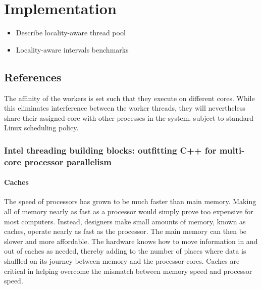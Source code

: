 
\chapter{Implementation}
\label{chap:locality-implementation}


\begin{itemize}
\item Describe locality-aware thread pool
\item Locality-aware intervals benchmarks
\end{itemize}

\section{References}

The affinity of the workers is set such that they execute on different
cores. While this eliminates interference between the worker threads,
they will nevertheless share their assigned core with other processes
in the system, subject to standard Linux scheduling policy.

\subsection*{Intel threading building blocks: outfitting C++ for
  multi-core processor parallelism \cite{Reinders2007}}

\subsubsection{Caches}

The speed of processors has grown to be much faster than main
memory. Making all of memory nearly as fast as a processor would
simply prove too expensive for most computers. Instead, designers make
small amounts of memory, known as caches, operate nearly as fast as
the processor. The main memory can then be slower and more
affordable. The hardware knows how to move information in and out of
caches as needed, thereby adding to the number of places where data is
shuffled on its journey between memory and the processor cores. Caches
are critical in helping overcome the mismatch between memory speed and
processor speed.

